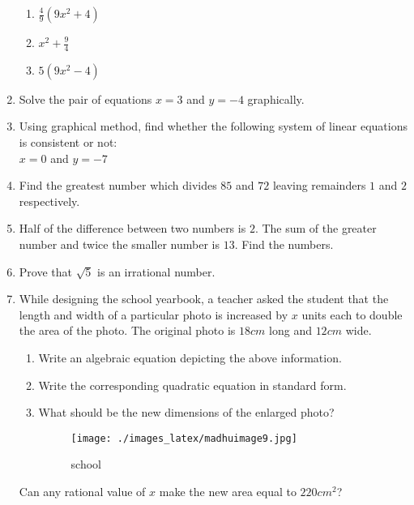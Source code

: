 \documentclass{article}
\begin{document}
\begin{enumerate}
\begin{enumerate}
\item $\frac{4}{9}(9x^2 + 4)$
\item $x^2 + \frac{9}{4}$
\item $5(9x^2 - 4)$ 
\end{enumerate}
\item Solve the pair of equations $x = 3$ and $y = -4$ graphically.
\item Using graphical method, find whether the following system of linear equations is consistent or not:\\
	$x = 0$ and $y = -7$
\item Find the greatest number which divides $85$ and $72$ leaving remainders $1$ and $2$ respectively.
\item Half of the difference between two numbers is $2$. The sum of the greater number and twice the smaller number is $13$. Find the numbers.
\item Prove that $\sqrt{5}$ is an irrational number.
\item While designing the school yearbook, a teacher asked the student that the length and width of a particular photo is increased by $x$ units each to double the area of the photo. The original photo is $18 cm$ long and $12 cm$ wide. 
\begin{enumerate} 
\item Write an algebraic equation depicting the above information.
\item Write the corresponding quadratic equation in standard form. 
\item What should be the new dimensions of the enlarged photo? 
\begin{figure}[H]
\centering 
\texttt{[image: ./images\_latex/madhuimage9.jpg]}   
\label{fig:fig9}
\caption{school}
\end{figure} 
\end{enumerate}
Can any rational value of $x$ make the new area equal to $220 cm^2$?

\end{enumerate}
\end{document}
